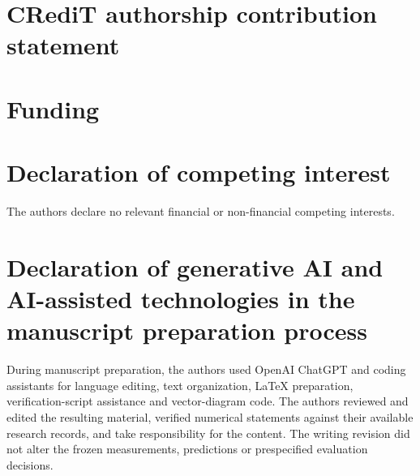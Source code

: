 \documentclass[preprint,11pt,times,number,sort&compress]{elsarticle}
\begin{document}
\section*{CRediT authorship contribution statement}
\AuthorContributions
\section*{Funding}
\FundingStatement
\section*{Declaration of competing interest}
The authors declare no relevant financial or non-financial competing interests.
\section*{Declaration of generative AI and AI-assisted technologies in the manuscript preparation process}
During manuscript preparation, the authors used OpenAI ChatGPT and coding assistants for language editing, text organization, LaTeX preparation, verification-script assistance and vector-diagram code. The authors reviewed and edited the resulting material, verified numerical statements against their available research records, and take responsibility for the content. The writing revision did not alter the frozen measurements, predictions or prespecified evaluation decisions.

\begingroup\small{}


\endgroup
\end{document}
